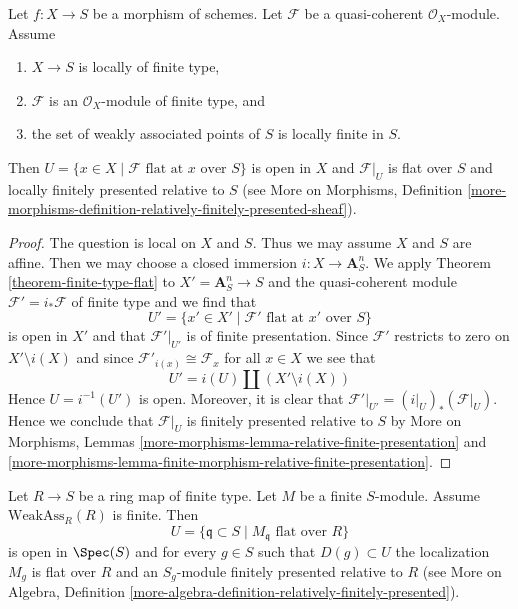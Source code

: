 \begin{lemma}
\label{lemma-finite-type-flat}
Let $f : X \to S$ be a morphism of schemes.
Let $\mathcal{F}$ be a quasi-coherent $\mathcal{O}_X$-module.
Assume
\begin{enumerate}
\item $X \to S$ is locally of finite type,
\item $\mathcal{F}$ is an $\mathcal{O}_X$-module of finite type, and
\item the set of weakly associated points of $S$ is locally finite in $S$.
\end{enumerate}
Then $U = \{x \in X \mid \mathcal{F}\text{ flat at }x\text{ over }S\}$
is open in $X$ and $\mathcal{F}|_U$ is flat over $S$ and locally
finitely presented relative to $S$ (see
More on Morphisms, Definition
\ref{more-morphisms-definition-relatively-finitely-presented-sheaf}).
\end{lemma}

\begin{proof}
The question is local on $X$ and $S$. Thus we may assume $X$ and $S$ are affine.
Then we may choose a closed immersion $i : X \to \mathbf{A}^n_S$.
We apply Theorem \ref{theorem-finite-type-flat} to $X' = \mathbf{A}^n_S \to S$
and the quasi-coherent module $\mathcal{F}' = i_*\mathcal{F}$ of finite type
and we find that
$$
U' = \{x' \in X' \mid \mathcal{F}'\text{ flat at }x'\text{ over }S\}
$$
is open in $X'$ and that $\mathcal{F}'|_{U'}$ is of finite presentation.
Since $\mathcal{F}'$ restricts to zero on $X' \setminus i(X)$ and
since $\mathcal{F}'_{i(x)} \cong \mathcal{F}_x$ for all $x \in X$ we see that
$$
U' = i(U) \amalg (X' \setminus i(X))
$$
Hence $U = i^{-1}(U')$ is open. Moreover, it is clear that
$\mathcal{F}'|_{U'} = (i|_U)_*(\mathcal{F}|_U)$.
Hence we conclude that $\mathcal{F}|_U$ is finitely presented
relative to $S$ by More on Morphisms, Lemmas
\ref{more-morphisms-lemma-relative-finite-presentation} and
\ref{more-morphisms-lemma-finite-morphism-relative-finite-presentation}.
\end{proof}

\begin{lemma}
\label{lemma-finite-type-flat-algebra-bis}
Let $R \to S$ be a ring map of finite type.
Let $M$ be a finite $S$-module.
Assume $\text{WeakAss}_R(R)$ is finite.
Then
$$
U = \{\mathfrak q \subset S \mid M_{\mathfrak q}\text{ flat over }R\}
$$
is open in $\Spec(S)$ and for every $g \in S$ such that
$D(g) \subset U$ the localization $M_g$ is flat over $R$ and
an $S_g$-module finitely presented relative to $R$ (see
More on Algebra, Definition
\ref{more-algebra-definition-relatively-finitely-presented}).
\end{lemma}

